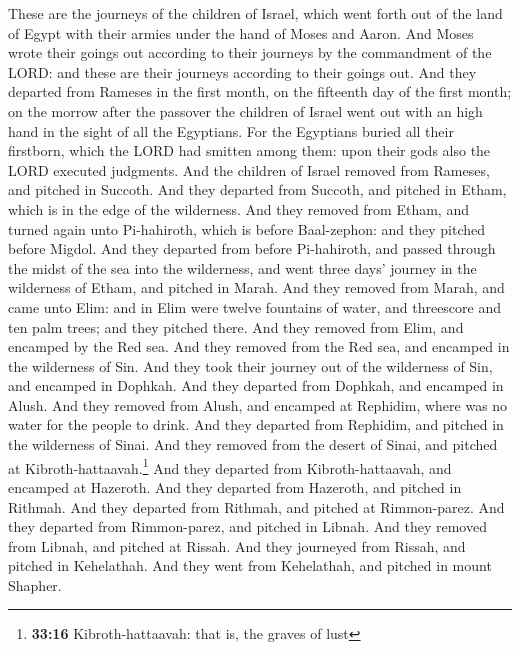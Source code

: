 These are the journeys of the children of Israel, which
went forth out of the land of Egypt with their armies under the hand of
Moses and Aaron.  And Moses wrote their goings out
according to their journeys by the commandment of the LORD: and these
are their journeys according to their goings out.  And
they departed from Rameses in the first month, on the fifteenth day of
the first month; on the morrow after the passover the children of Israel
went out with an high hand in the sight of all the Egyptians.
 For the Egyptians buried all their firstborn, which the
LORD had smitten among them: upon their gods also the LORD executed
judgments.  And the children of Israel removed from
Rameses, and pitched in Succoth.  And they departed from
Succoth, and pitched in Etham, which is in the edge of the wilderness.
 And they removed from Etham, and turned again unto
Pi-hahiroth, which is before Baal-zephon: and they pitched before
Migdol.  And they departed from before Pi-hahiroth, and
passed through the midst of the sea into the wilderness, and went three
days' journey in the wilderness of Etham, and pitched in Marah.
 And they removed from Marah, and came unto Elim: and in
Elim were twelve fountains of water, and threescore and ten palm trees;
and they pitched there.  And they removed from Elim, and
encamped by the Red sea.  And they removed from the Red
sea, and encamped in the wilderness of Sin.  And they
took their journey out of the wilderness of Sin, and encamped in
Dophkah.  And they departed from Dophkah, and encamped in
Alush.  And they removed from Alush, and encamped at
Rephidim, where was no water for the people to drink. 
And they departed from Rephidim, and pitched in the wilderness of Sinai.
 And they removed from the desert of Sinai, and pitched
at Kibroth-hattaavah.\footnote{\textbf{33:16} Kibroth-hattaavah: that
  is, the graves of lust}  And they departed from
Kibroth-hattaavah, and encamped at Hazeroth.  And they
departed from Hazeroth, and pitched in Rithmah.  And they
departed from Rithmah, and pitched at Rimmon-parez.  And
they departed from Rimmon-parez, and pitched in Libnah. 
And they removed from Libnah, and pitched at Rissah.  And
they journeyed from Rissah, and pitched in Kehelathah. 
And they went from Kehelathah, and pitched in mount Shapher.
